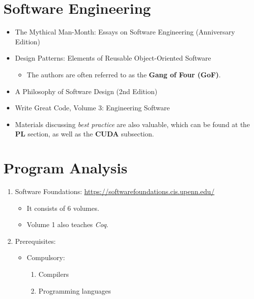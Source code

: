 \documentclass{article}
\begin{document}
\section{Software Engineering}
\begin{itemize}
    \item The Mythical Man-Month: Essays on Software Engineering (Anniversary Edition) \cite{brooks1995mythical}
    \item Design Patterns: Elements of Reusable Object-Oriented Software
    \cite{gamma1995design}
    \begin{itemize}
        \item The authors are often referred to as the \textbf{Gang of Four (GoF)}.
    \end{itemize}
    \item A Philosophy of Software Design (2nd Edition) \cite{ousterhout2018philosophy}
    \item Write Great Code, Volume 3: Engineering Software
    \cite{hyde2020writegreatcode}
    \item Materials discussing \emph{best practice} are also valuable, which can be found at the \textbf{PL} section, as well as the \textbf{CUDA} subsection.
\end{itemize}

\section{Program Analysis}
\begin{enumerate}
    \item Software Foundations:
        \href{https://softwarefoundations.cis.upenn.edu/}{https://softwarefoundations.cis.upenn.edu/}
        \begin{itemize}
            \item It consists of 6 volumes.
            \item Volume 1 also teaches \emph{Coq}.
        \end{itemize}
    \item Prerequisites:
    \begin{itemize}
        \item Compulsory:
        \begin{enumerate}
            \item Compilers
            \item Programming languages
        \end{enumerate}
    \end{itemize}
\end{enumerate}
\end{document}

